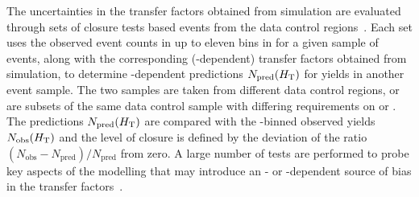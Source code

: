 
The uncertainties in the transfer factors obtained from simulation are
evaluated through sets of closure tests based events from the data
control regions~\cite{RA1Paper2012}. Each set uses the observed event
counts in up to eleven bins in \scalht for a given sample of events,
along with the corresponding (\scalht-dependent) transfer factors
obtained from simulation, to determine \scalht-dependent predictions
$N_\text{pred}(H_\text{T})$ for yields in another event sample. The two
samples are taken from different data control regions, or are subsets
of the same data control sample with differing requirements on \njet
or \nb. The predictions $N_\text{pred}(H_\text{T})$ are compared with the
\scalht-binned observed yields $N_\text{obs}(H_\text{T})$ and the level
of closure is defined by the deviation of the ratio $(N_\text{obs} -
N_\text{pred})/N_\text{pred}$ from zero. A large number of tests are
performed to probe key aspects of the modelling that may introduce an
\njet- or \scalht-dependent source of bias in the transfer
factors~\cite{RA1Paper2012}.

